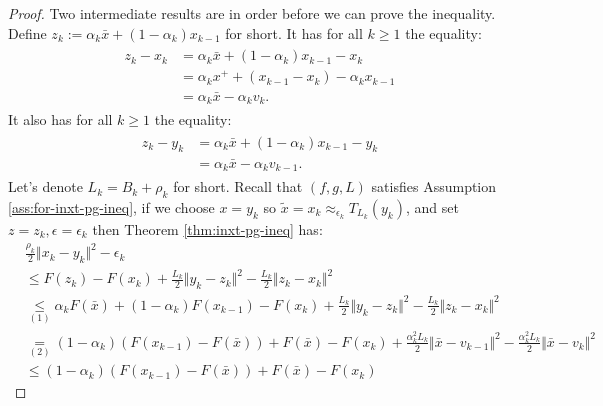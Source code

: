 \documentclass[12pt]{article}
\begin{document}
    \begin{proof}
        Two intermediate results are in order before we can prove the inequality. 
        Define $z_k := \alpha_k \bar x + (1 - \alpha_k)x_{k - 1}$ for short. 
        It has for all $k \ge 1$ the equality: 
        \begin{align}\tag{a}\label{eqn:inxt-apg-cnvg-prep1-a}\begin{split}
            z_k - x_k &= 
            \alpha_k \bar x + (1 - \alpha_k)x_{k - 1} - x_k
            \\
            &= \alpha_kx^+ + (x_{k - 1} - x_k) - \alpha_kx_{k - 1}
            \\
            &= \alpha_k \bar x - \alpha_k v_k. 
        \end{split}\end{align}
        It also has for all $k \ge 1$ the equality: 
        \begin{align}\tag{b}\label{eqn:inxt-apg-cnvg-prep1-b}\begin{split}
            z_k - y_k &= 
            \alpha_k \bar x + (1 - \alpha_k)x_{k - 1} - y_k
            \\
            &= \alpha_k \bar x - \alpha_k v_{k - 1}. 
        \end{split}\end{align}
        Let's denote $L_k = B_k + \rho_k$ for short. 
        Recall that $(f, g, L)$ satisfies Assumption \ref{ass:for-inxt-pg-ineq}, if we choose $x = y_k$ so $\tilde x = x_k \approx_{\epsilon_k} T_{L_k}(y_k)$, and set $z = z_k, \epsilon = \epsilon_k$ then Theorem \ref{thm:inxt-pg-ineq} has: 
        \begin{align*}
            & \frac{\rho_k}{2}\Vert x_k - y_k\Vert^2 - \epsilon_k
            \\
            &\le
            F(z_k) - F(x_k) + \frac{L_k}{2}\Vert y_k - z_k\Vert^2 - \frac{L_k}{2}\Vert z_k - x_k\Vert^2
            \\
            &\underset{(1)}{\le} \alpha_k F(\bar x) + (1 - \alpha_k)F(x_{k - 1}) - F(x_k)
            + \frac{L_k}{2}\Vert y_k - z_k\Vert^2 - \frac{L_k}{2}\Vert z_k - x_k\Vert^2
            \\
            &\underset{(2)}{=} 
            (1 - \alpha_k)(F(x_{k - 1}) - F(\bar x)) + F(\bar x) - F(x_k) 
            + \frac{\alpha_k^2L_k}{2}\Vert \bar x - v_{k - 1}\Vert^2 
            - \frac{\alpha_k^2L_k}{2}\Vert \bar x - v_{k}\Vert^2 
            \\
            &\le 
            (1 - \alpha_k)(F(x_{k - 1}) - F(\bar x)) + F(\bar x) - F(x_k) 

\end{align*}
\end{proof}
\end{document}
